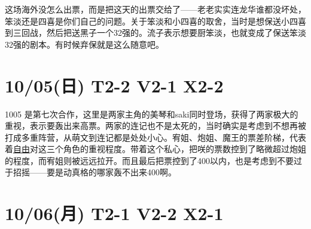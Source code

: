 这场海外没怎么出票，而是把这天的出票交给了——老老实实连龙华谁都没坏处，笨淡还是四喜是你们自己的问题。关于笨淡和小四喜的取舍，当时是想保送小四喜到三回战，然后把送黑子一个32强的。流子表示想要厨笨淡，也就变成了保送笨淡32强的剧本。有时候弃保就是这么随意吧。

\section{10/05(日) T2-2 V2-1 X2-2}


1005 是第七次合作，这里是两家主角的美琴和saki同时登场，获得了两家极大的重视，表示要轰出来高票。两家的连记也不是太死的，当时确实是考虑到不想再被打成多重阵营，从萌文到连记都是处处小心。宥姐、炮姐、魔王的票差阶梯，代表着\uline{自由}对这三个角色的重视程度。带着这个私心，把咲的票数控到了略微超过炮姐的程度，而宥姐则被远远拉开。而且最后把票控到了400以内，也是考虑到不要过于招摇——要是动真格的哪家轰不出来400啊。

\section{10/06(月) T2-1 V2-2 X2-1}


